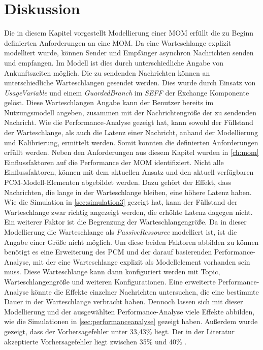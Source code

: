 \section{Diskussion}
Die in diesem Kapitel vorgestellt Modellierung einer MOM erfüllt die zu Beginn definierten Anforderungen an eine MOM. Da eine Warteschlange explizit modelliert wurde, können Sender und Empfänger asynchron Nachrichten senden und empfangen. Im Modell ist dies durch unterschiedliche Angabe von Ankunftszeiten möglich. Die zu sendenden Nachrichten können an unterschiedliche Warteschlangen gesendet werden. Dies wurde durch Einsatz von \emph{UsageVariable} und einem \emph{GuardedBranch} im \emph{SEFF} der Exchange Komponente gelöst. Diese Warteschlangen Angabe kann der Benutzer bereits im Nutzungsmodell angeben, zusammen mit der Nachrichtengröße der zu sendenden Nachricht. Wie die Performance-Analyse gezeigt hat, kann sowohl der Füllstand der Warteschlange, als auch die Latenz einer Nachricht, anhand der Modellierung und Kalibrierung, ermittelt werden. Somit konnten die definierten Anforderungen erfüllt werden. Neben den Anforderungen aus diesem Kapitel wurden in \autoref{ch:mom} Einflussfaktoren auf die Performance der MOM identifiziert. Nicht alle Einflussfaktoren, können mit dem aktuellen Ansatz und den aktuell verfügbaren PCM-Modell-Elementen  abgebildet werden. Dazu gehört der Effekt, dass Nachrichten, die lange in der Warteschlange bleiben, eine höhere Latenz haben. Wie die Simulation in \autoref{sec:simulation3} gezeigt hat, kann der Füllstand der Warteschlange zwar richtig angezeigt werden, die erhöhte Latenz dagegen nicht. Ein weiterer Faktor ist die Begrenzung der Warteschlangengröße. Da in dieser Modellierung die Warteschlange als \emph{PassiveRessource} modelliert ist, ist die Angabe einer Größe nicht möglich. Um diese beiden Faktoren abbilden zu können benötigt es eine Erweiterung des PCM und der darauf basierenden Performance-Analyse, mit der eine Warteschlange explizit als Modellelement vorhanden sein muss. Diese Warteschlange kann dann konfiguriert werden mit Topic, Warteschlangengröße und weiteren Konfigurationen. Eine erweiterte Performance-Analyse könnte die Effekte einzelner Nachrichten untersuchen, die eine bestimmte Dauer in der Warteschlange verbracht haben. Dennoch lassen sich mit dieser Modellierung und der ausgewählten Performance-Analyse viele Effekte abbilden, wie die Simulationen in \autoref{sec:performanceanalyse} gezeigt haben. Außerdem wurde gezeigt, dass der Vorhersagefehler unter 33,43\% liegt. Der in der Literatur akzeptierte Vorhersagefehler liegt zwischen 35\% und 40\% \cite{error}. \par
